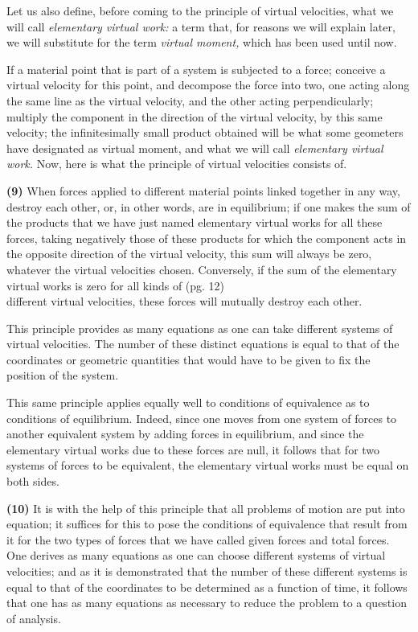 \documentclass{book}
\begin{document}
Let us also define, before coming to the principle of virtual velocities, what we will call \textit{elementary virtual work:} a term that, for reasons we will explain later, we will substitute for the term \textit{virtual moment,} which has been used until now. 

If a material point that is part of a system is subjected to a force; conceive a virtual velocity for this point, and decompose the force into two, one acting along the same line as the virtual velocity, and the other acting perpendicularly; multiply the component in the direction of the virtual velocity, by this same velocity; the infinitesimally small product obtained will be what some geometers have designated as virtual moment, and what we will call \textit{elementary virtual work.} Now, here is what the principle of virtual velocities consists of.

\textbf{(9)} When forces applied to different material points linked together in any way, destroy each other, or, in other words, are in equilibrium; if one makes the sum of the products that we have just named elementary virtual works for all these forces, taking negatively those of these products for which the component acts in the opposite direction of the virtual velocity, this sum will always be zero, whatever the virtual velocities chosen. Conversely, if the sum of the elementary virtual works is zero for all kinds of 
\newpage
(pg. 12)\\
different virtual velocities, these forces will mutually destroy each other.

This principle provides as many equations as one can take different systems of virtual velocities. The number of these distinct equations is equal to that of the coordinates or geometric quantities that would have to be given to fix the position of the system.

This same principle applies equally well to conditions of equivalence as to conditions of equilibrium. Indeed, since one moves from one system of forces to another equivalent system by adding forces in equilibrium, and since the elementary virtual works due to these forces are null, it follows that for two systems of forces to be equivalent, the elementary virtual works must be equal on both sides.

\textbf{(10)} It is with the help of this principle that all problems of motion are put into equation; it suffices for this to pose the conditions of equivalence that result from it for the two types of forces that we have called given forces and total forces. One derives as many equations as one can choose different systems of virtual velocities; and as it is demonstrated that the number of these different systems is equal to that of the coordinates to be determined as a function of time, it follows that one has as many equations as necessary to reduce the problem to a question of analysis.
\end{document}
